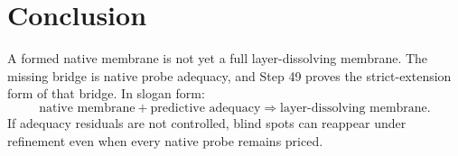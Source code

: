 \documentclass[11pt]{article}
\begin{document}
\section{Conclusion}

A formed native membrane is not yet a full layer-dissolving membrane. The missing bridge is native probe adequacy, and Step 49 proves the strict-extension form of that bridge. In slogan form:
\[
  \boxed{\text{native membrane} + \text{predictive adequacy} \Rightarrow \text{layer-dissolving membrane}.}
\]
If adequacy residuals are not controlled, blind spots can reappear under refinement even when every native probe remains priced.
\end{document}
